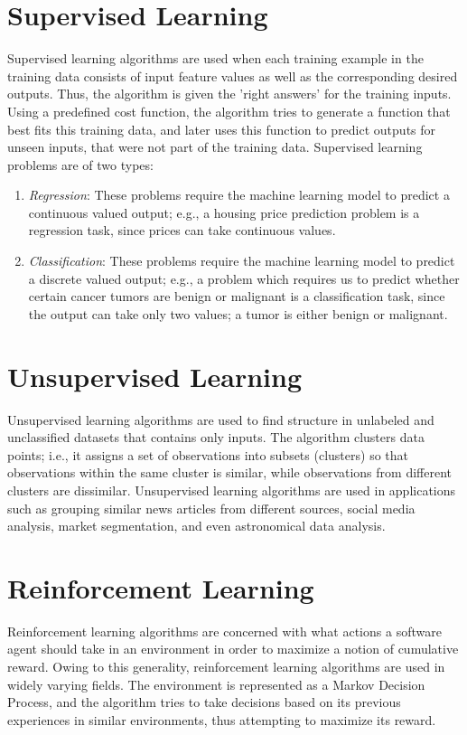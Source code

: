 \documentclass[a4paper, 12pt]{report}
\begin{document}
\section{Supervised Learning}
Supervised learning algorithms are used when each training example in the training data consists of input feature values as well as the corresponding desired outputs. Thus, the algorithm is given the 'right answers' for the training inputs. Using a predefined cost function, the algorithm tries to generate a function that best fits this training data, and later uses this function to predict outputs for unseen inputs, that were not part of the training data. Supervised learning problems are of two types:
\begin{enumerate}
\item \textit{Regression}: These problems require the machine learning model to predict a continuous valued output; e.g., a housing price prediction problem is a regression task, since prices can take continuous values.
\item \textit{Classification}: These problems require the machine learning model to predict a discrete valued output; e.g., a problem which requires us to predict whether certain cancer tumors are benign or malignant is a classification task, since the output can take only two values; a tumor is either benign or malignant.
\end{enumerate}

\section{Unsupervised Learning}
Unsupervised learning algorithms are used to find structure in unlabeled and unclassified datasets that contains only inputs. The algorithm clusters data points; i.e., it assigns a set of observations into subsets (clusters) so that observations within the same cluster is similar, while observations from different clusters are dissimilar. Unsupervised learning algorithms are used in applications such as grouping similar news articles from different sources, social media analysis, market segmentation, and even astronomical data analysis.

\section{Reinforcement Learning}
Reinforcement learning algorithms are concerned with what actions a software agent should take in an environment in order to maximize a notion of cumulative reward. Owing to this generality, reinforcement learning algorithms are used in widely varying fields. The environment is represented as a Markov Decision Process, and the algorithm tries to take decisions based on its previous experiences in similar environments, thus attempting to maximize its reward.
\end{document}
